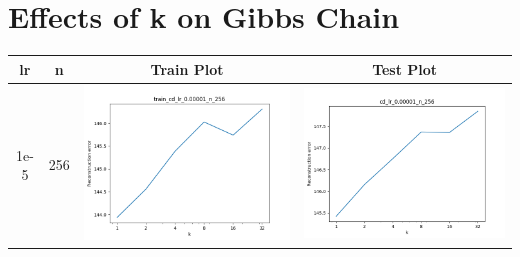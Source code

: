 \documentclass[12pt]{report}
\begin{document}
\section{Effects of k on Gibbs Chain}
\begin{table}[H]
  \centering
  \begin{tabular}{ | c | c | c | c |}
    \hline
    \textbf{lr} & \textbf{n} & \textbf{Train Plot} & \textbf{Test Plot} \\ \hline
    1e-5 & 256 &
    \begin{minipage}{.3\textwidth}
      \includegraphics[scale=0.25]{train_cd_lr_0_00001_n_256.png}
    \end{minipage} &
    \begin{minipage}{.3\textwidth}
      \includegraphics[scale=0.25]{cd_lr_0_00001_n_256.png}

\end{minipage}
\end{tabular}
\end{table}
\end{document}
